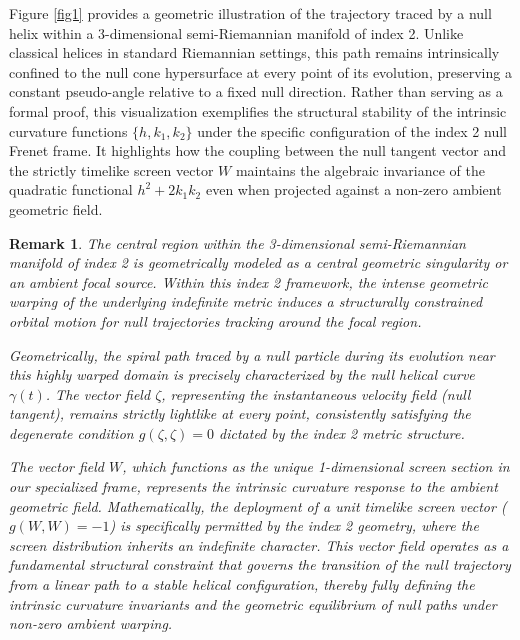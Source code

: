 \documentclass [reqno]{amsart}
\theoremstyle{plain}
\newtheorem{remark}{Remark}
\numberwithin{equation}{section}
\begin{document}
Figure \ref{fig1} provides a geometric illustration of the trajectory traced by a null helix within a 3-dimensional semi-Riemannian manifold of index 2. Unlike classical helices in standard Riemannian settings, this path remains intrinsically confined to the null cone hypersurface at every point of its evolution, preserving a constant pseudo-angle relative to a fixed null direction. Rather than serving as a formal proof, this visualization exemplifies the structural stability of the intrinsic curvature functions $\{h,k_1,k_2\}$ under the specific configuration of the index 2 null Frenet frame. It highlights how the coupling between the null tangent vector and the strictly timelike screen vector $W$ maintains the algebraic invariance of the quadratic functional $h^2+2k_1 k_2$ even when projected against a non-zero ambient geometric field.

\begin{remark}
The central region within the 3-dimensional semi-Riemannian manifold of index 2 is geometrically modeled as a central geometric singularity or an ambient focal source. Within this index 2 framework, the intense geometric warping of the underlying indefinite metric induces a structurally constrained orbital motion for null trajectories tracking around the focal region.

Geometrically, the spiral path traced by a null particle during its evolution near this highly warped domain is precisely characterized by the null helical curve $\gamma(t)$. The vector field $\zeta$, representing the instantaneous velocity field (null tangent), remains strictly lightlike at every point, consistently satisfying the degenerate condition $g(\zeta,\zeta)=0$ dictated by the index 2 metric structure.

The vector field $W$, which functions as the unique 1-dimensional screen section in our specialized frame, represents the intrinsic curvature response to the ambient geometric field. Mathematically, the deployment of a unit timelike screen vector ($g(W,W)=-1$) is specifically permitted by the index 2 geometry, where the screen distribution inherits an indefinite character. This vector field operates as a fundamental structural constraint that governs the transition of the null trajectory from a linear path to a stable helical configuration, thereby fully defining the intrinsic curvature invariants and the geometric equilibrium of null paths under non-zero ambient warping.
\end{remark}
\end{document}
